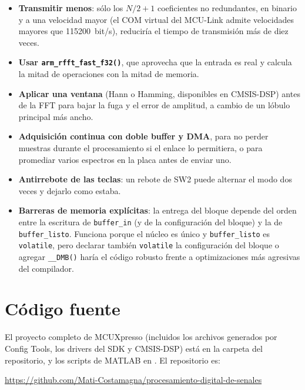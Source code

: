 \documentclass[11pt,a4paper]{article}
\begin{document}
\begin{itemize}[nosep]
  \item \textbf{Transmitir menos}: sólo los $N/2+1$ coeficientes no
        redundantes, en binario y a una velocidad mayor (el COM virtual del
        MCU-Link admite velocidades mayores que \num{115200}~bit/s),
        reduciría el tiempo de transmisión más de diez veces.
  \item \textbf{Usar \texttt{arm\_rfft\_fast\_f32()}}, que aprovecha que la
        entrada es real y calcula la mitad de operaciones con la mitad de
        memoria.
  \item \textbf{Aplicar una ventana} (Hann o Hamming, disponibles en
        CMSIS-DSP) antes de la FFT para bajar la fuga y el error de
        amplitud, a cambio de un lóbulo principal más ancho.
  \item \textbf{Adquisición continua con doble buffer y DMA}, para no
        perder muestras durante el procesamiento si el enlace lo permitiera,
        o para promediar varios espectros en la placa antes de enviar uno.
  \item \textbf{Antirrebote de las teclas}: un rebote de SW2 puede alternar
        el modo dos veces y dejarlo como estaba.
  \item \textbf{Barreras de memoria explícitas}: la entrega del bloque
        depende del orden entre la escritura de \texttt{buffer\_in} (y de
        la configuración del bloque) y la de \texttt{buffer\_listo}.
        Funciona porque el núcleo es único y \texttt{buffer\_listo} es
        \texttt{volatile}, pero declarar también \texttt{volatile} la
        configuración del bloque o agregar \texttt{\_\_DMB()} haría el
        código robusto frente a optimizaciones más agresivas del
        compilador.
\end{itemize}

\clearpage
\appendix
\section{Código fuente}\label{sec:codigo}

El proyecto completo de MCUXpresso (incluidos los archivos generados por
Config Tools, los drivers del SDK y CMSIS-DSP) está en la carpeta
 del repositorio, y los scripts de MATLAB en
. El repositorio es:
\begin{center}
\url{https://github.com/Mati-Costamagna/procesamiento-digital-de-senales}
\end{center}
\end{document}
